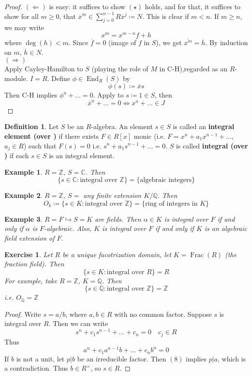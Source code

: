 \documentclass[12pt]{article}
\newcommand{\z}{\mathbb{Z}}
\newcommand{\q}{\mathbb{Q}}
\newcommand{\cx}{\mathbb{C}}
\DeclareMathOperator{\End}{End}
\DeclareMathOperator{\Frac}{Frac}
\newtheorem*{eg}{Example}
\newtheorem*{exercise}{Exercise}
\theoremstyle{definition}
\newtheorem{definition}[theorem]{Definition}
\begin{document}
\begin{proof}
$(\Leftarrow)$ is easy: it suffices to show $(\star)$ holds, and for that, it suffices to show for all $m\geq 0$, that $\overline{x}^m \in \sum_{j=0}^{n-1}R\overline{x}^j \coloneqq N$. This is clear if $m<n$. If $m\geq n$, we may write
\[
x^m = x^{m-n}f + h
\]
where $\deg (h)< m$. Since $\overline{f} =0$ (image of $f$ in $S$), we get $\overline{x^m} = \overline{h}$. By induction on $m$, $\overline{h}\in N$.\\
$(\Rightarrow)$\\
Apply Cayley-Hamilton to $S$ (playing the role of $M$ in C-H),regarded as an $R$-module.  $I= R$. Define $\phi \in \End_R(S)$ by
\[
\phi(s) \coloneqq \overline{x}s
\]
Then C-H implies $\phi^n + \dots = 0$. Apply to $s\coloneqq 1 \in S$, then
\[
\overline{x}^n + \dots  = 0 \iff x^n + \dots \in J
\]
\end{proof}
\begin{definition}
Let $S$ be an $R$-algebra. An element $s\in S$ is called an \textbf{integral element (over )} if there exists $F \in R[x]$ monic (i.e. $F = x^n + a_1x^{n-1} + \dots$, $a_j \in R$) such that $F(s) = 0$ i.e. $s^n + a_1s^{n-1}+\dots = 0$. $S$ is called \textbf{integral (over )} if each $s\in S$ is an integral element.  
\end{definition}
\begin{eg}
$R= \z$, $S = \cx$. Then
\[
\{s\in \cx: \text{integral over }\z\} = \{\text{algebraic integers}\}
\]
\end{eg}
\begin{eg}
$R = \z$, $S= $ any finite extension $K/\q$. Then
\[
O_k\coloneqq \{s\in K: \text{integral over }\z\} = \{\text{ring of integers in }K\}
\]
\end{eg}
\begin{eg}
$R = F \hookrightarrow S = K$ are fields. Then $\alpha \in K$ is integral over $F$ if and only if $\alpha$ is  $F$-algebraic. Also, $K$ is integral over $F$ if and only if $K$ is an algebraic field extension of $F$.
\end{eg}
\begin{exercise}
Let $R$ be a unique facotrization domain, let $K = \Frac(R)$ (the fraction field). Then 
\[
\{s\in K: \text{integral over }R\} = R
\]
For example, take $R = \z$, $K = \q$. Then
\[
\{s\in \q: \text{integral over }\z\} = \z
\]
i.e. $O_\q = \z$
\end{exercise}
\begin{proof}
Write $s = a/b$, where $a,b \in R$ with no common factor. Suppose $s$ is integral over $R$. Then we can write
\[
s^n+c_1s^{n-1}+\dots + c_n = 0 \quad c_j\in R
\]
Thus
\begin{equation}
a^n +c_1a^{n-1}b + \dots +c_nb^n =0
\end{equation}
If $b$ is not a unit, let $p|b$ be an irreducible factor. Then $(8)$ implies $p|a$, which is a contradiction. Thus $b\in R^\times$, so $s\in R$.
\end{proof}
\end{document}
